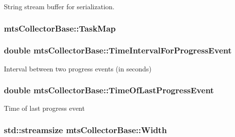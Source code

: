 String stream buffer for serialization. \hypertarget{classmts_collector_base_a4e9b221e6cdeb2fbddaf44ffbe9e3b0e}{
\subsubsection[{Task\-Map}]{ mts\-Collector\-Base\-::\-Task\-Map\hspace{0.3cm}{\ttfamily [protected]}}}\label{classmts_collector_base_a4e9b221e6cdeb2fbddaf44ffbe9e3b0e}
\hypertarget{classmts_collector_base_ab6c33b31e4651991098cd0963a575d24}{
\subsubsection[{Time\-Interval\-For\-Progress\-Event}]{\setlength{\rightskip}{0pt plus 5cm}double mts\-Collector\-Base\-::\-Time\-Interval\-For\-Progress\-Event\hspace{0.3cm}{\ttfamily [protected]}}}\label{classmts_collector_base_ab6c33b31e4651991098cd0963a575d24}
Interval between two progress events (in seconds) \hypertarget{classmts_collector_base_aa33295c29dd9bc683cb95a9f57c5a09e}{
\subsubsection[{Time\-Of\-Last\-Progress\-Event}]{\setlength{\rightskip}{0pt plus 5cm}double mts\-Collector\-Base\-::\-Time\-Of\-Last\-Progress\-Event\hspace{0.3cm}{\ttfamily [protected]}}}\label{classmts_collector_base_aa33295c29dd9bc683cb95a9f57c5a09e}
Time of last progress event \hypertarget{classmts_collector_base_add0435d1bd0dfaed9f54bc82831ca3ea}{
\subsubsection[{Width}]{\setlength{\rightskip}{0pt plus 5cm}std\-::streamsize mts\-Collector\-Base\-::\-Width\hspace{0.3cm}{\ttfamily [protected]}}}\label{classmts_collector_base_add0435d1bd0dfaed9f54bc82831ca3ea}
